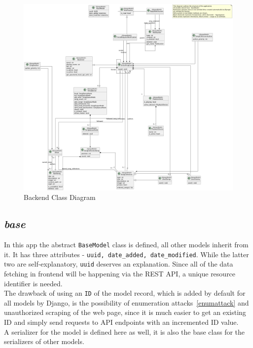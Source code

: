 \begin{figure}[htbp]
    \centering
    \begin{adjustbox}{angle=90, width=1.4\textwidth, center}
        \includegraphics{diagrams/class.png}
    \end{adjustbox}
    \caption{Backend Class Diagram}
    \label{fig:beclassdiagram}
\end{figure}

\subsection{\textit{base}}
In this app the abstract \texttt{BaseModel} class is defined, all other models inherit from it.
It has three attributes - \texttt{uuid, date\_added, date\_modified}. While the latter two are self-explanatory,
\texttt{uuid} deserves an explanation. Since all of the data fetching in frontend will be happening via the REST API,
a unique resource identifier is needed.\\
The drawback of using an \texttt{ID} of the model record, which is added by default for all models by Django,
is the possibility of enumeration attacks~\ref{enumattack} and unauthorized scraping of the web page, since it is
much easier to get an existing ID and simply send requests to API endpoints with an incremented ID value.\\
A serializer for the model is defined here as well, it is also the base class for the serializers of other models.

